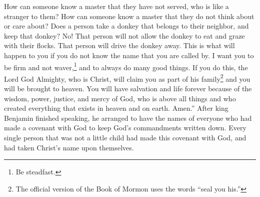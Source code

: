 How can someone know a master that they have not served, who is like a stranger to them? How can someone know a master that they do not think about or care about?
\bverse \iffalse And again, doth a man take an ass which belongeth to his neighbor, and keep him? I say unto you, Nay; he will not even suffer that he shall feed among his flocks, but will drive him away, and cast him out. I say unto you, that even so shall it be among you if ye know not the name by which ye are called. \fi
Does a person take a donkey that belongs to their neighbor, and keep that donkey? No! That person will not allow the donkey to eat and graze with their flocks. That person will drive the donkey away. This is what will happen to you if you do not know the name that you are called by.
\bverse \iffalse Therefore, I would that ye should be steadfast and immovable, always abounding in good works, that Christ, the Lord God Omnipotent, may seal you his, that you may be brought to heaven, that ye may have everlasting salvation and eternal life, through the wisdom, and power, and justice, and mercy of him who created all things, in heaven and in earth, who is God above all. Amen. \fi
I want you to be firm and not waver,\footnote{Be steadfast.} and to always do many good things. If you do this, the Lord God Almighty, who is Christ, will claim you as part of his family\footnote{The official version of the Book of Mormon uses the words ``seal you his.''} and you will be brought to heaven. You will have salvation and life forever because of the wisdom, power, justice, and mercy of God, who is above all things and who created everything that exists in heaven and on earth. Amen.''
\bchapter
\bverse \iffalse And now, king Benjamin thought it was expedient, after having finished speaking to the people, that he should take the names of all those who had entered into a covenant with God to keep his commandments. \fi
After king Benjamin finished speaking, he arranged to have the names of everyone who had made a covenant with God to keep God's commandments written down.
\bverse \iffalse And it came to pass that there was not one soul, except it were little children, but who had entered into the covenant and had taken upon them the name of Christ. \fi
Every single person that was not a little child had made this covenant with God, and had taken Christ's name upon themselves.
\bverse \iffalse And again, it came to pass that when king Benjamin had made an end of all these things, and had consecrated his son Mosiah to be a ruler and a king over his people, and had given him all the charges concerning the kingdom, and also had appointed priests to teach the people, that thereby they might hear and know the commandments of God, and to stir them up in remembrance of the oath which they had made, he dismissed the multitude, and they returned, every one, according to their families, to their own houses. \fi

